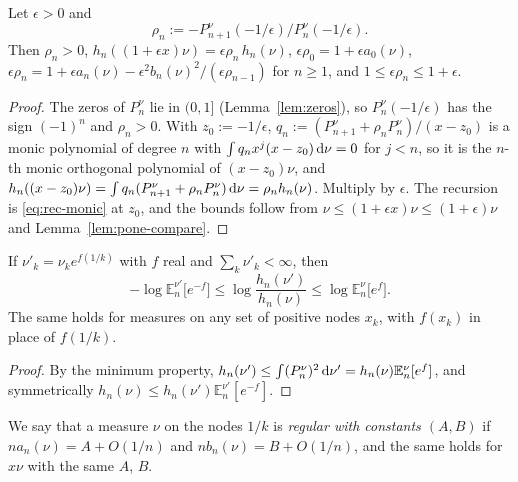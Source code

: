 \begin{lemma}\label{lem:pone-christoffel}
Let $\epsilon>0$ and
\[
  \rho_n:=-P^\nu_{n+1}(-1/\epsilon)/P^\nu_n(-1/\epsilon).
\]
Then $\rho_n>0$,
$h_n((1+\epsilon x)\nu)=\epsilon\rho_n\,h_n(\nu)$, $\epsilon\rho_0=1+\epsilon a_0(\nu)$,
$\epsilon\rho_n=1+\epsilon a_n(\nu)-\epsilon^2b_n(\nu)^2/(\epsilon\rho_{n-1})$ for $n\ge1$, and $1\le\epsilon\rho_n\le1+\epsilon$.
\end{lemma}

\begin{proof}
The zeros of $P_n^\nu$ lie in $(0,1]$ (Lemma~\ref{lem:zeros}), so $P_n^\nu(-1/\epsilon)$ has the sign $(-1)^n$ and
$\rho_n>0$. With $z_0:=-1/\epsilon$, $q_n:=(P^\nu_{n+1}+\rho_nP^\nu_n)/(x-z_0)$ is a monic polynomial of degree $n$ with
$\int q_nx^j(x-z_0)\,\mathrm{d}\nu=0$ for $j<n$, so it is the $n$-th monic orthogonal polynomial of $(x-z_0)\nu$, and
$h_n((x-z_0)\nu)=\int q_n(P^\nu_{n+1}+\rho_nP^\nu_n)\,\mathrm{d}\nu=\rho_nh_n(\nu)$. Multiply by $\epsilon$. The recursion is
\eqref{eq:rec-monic} at $z_0$, and the bounds follow from $\nu\le(1+\epsilon x)\nu\le(1+\epsilon)\nu$ and
Lemma~\ref{lem:pone-compare}.
\end{proof}

\begin{lemma}\label{lem:pone-sandwich}
If $\nu'_k=\nu_ke^{f(1/k)}$ with $f$ real and $\sum_k\nu'_k<\infty$, then
\[
  -\log\mathbb E_n^{\nu'}\bigl[e^{-f}\bigr]\le\log\frac{h_n(\nu')}{h_n(\nu)}\le\log\mathbb E_n^\nu\bigl[e^f\bigr].
\]
The same holds for measures on any set of positive nodes $x_k$, with $f(x_k)$ in place of $f(1/k)$.
\end{lemma}

\begin{proof}
By the minimum property, $h_n(\nu')\le\int(P_n^\nu)^2\,\mathrm{d}\nu'=h_n(\nu)\mathbb E_n^\nu[e^f]$, and symmetrically
$h_n(\nu)\le h_n(\nu')\mathbb E_n^{\nu'}[e^{-f}]$.
\end{proof}

We say that a measure $\nu$ on the nodes $1/k$ is \emph{regular with constants $(A,B)$} if $na_n(\nu)=A+O(1/n)$ and
$nb_n(\nu)=B+O(1/n)$, and the same holds for $x\nu$ with the same $A$, $B$.

